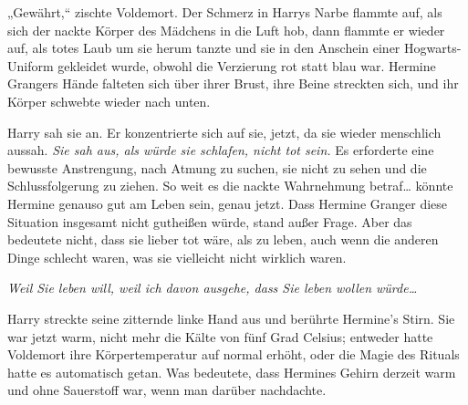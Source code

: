 „Gewährt,“ zischte Voldemort.
Der Schmerz in Harrys Narbe flammte auf, als sich der nackte Körper des Mädchens in die Luft hob, dann flammte er wieder auf, als totes Laub um sie herum tanzte und sie in den Anschein einer Hogwarts-Uniform gekleidet wurde, obwohl die Verzierung rot statt blau war. Hermine Grangers Hände falteten sich über ihrer Brust, ihre Beine streckten sich, und ihr Körper schwebte wieder nach unten.

Harry sah sie an. Er konzentrierte sich auf sie, jetzt, da sie wieder menschlich aussah.
\emph{Sie sah aus, als würde sie schlafen, nicht tot sein.} Es erforderte eine bewusste Anstrengung, nach Atmung zu suchen, sie nicht zu sehen und die Schlussfolgerung zu ziehen. So weit es die nackte Wahrnehmung betraf… könnte Hermine genauso gut am Leben sein, genau jetzt.
Dass Hermine Granger diese Situation insgesamt nicht gutheißen würde, stand außer Frage. Aber das bedeutete nicht, dass sie lieber tot wäre, als zu leben, auch wenn die anderen Dinge schlecht waren, was sie vielleicht nicht wirklich waren.

\emph{Weil Sie leben will, weil ich davon ausgehe, dass Sie leben wollen würde…}

Harry streckte seine zitternde linke Hand aus und berührte Hermine's Stirn. Sie war jetzt warm, nicht mehr die Kälte von fünf Grad Celsius; entweder hatte Voldemort ihre Körpertemperatur auf normal erhöht, oder die Magie des Rituals hatte es automatisch getan. Was bedeutete, dass Hermines Gehirn derzeit warm und ohne Sauerstoff war, wenn man darüber nachdachte.

